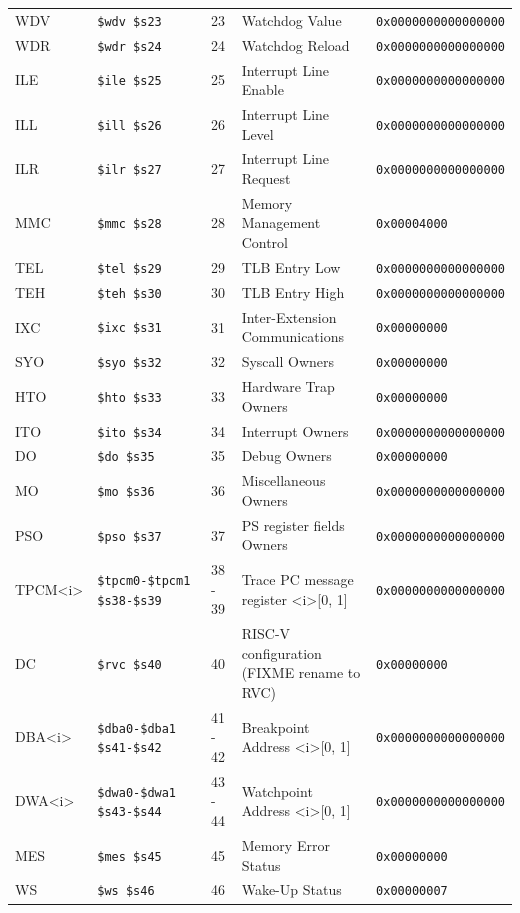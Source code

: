 {\begin{tabular}{|l|l|l|l|l|}
WDV & \verb|$wdv $s23| & 23 & Watchdog Value & \verb|0x0000000000000000| \\
WDR & \verb|$wdr $s24| & 24 & Watchdog Reload & \verb|0x0000000000000000| \\
ILE & \verb|$ile $s25| & 25 & Interrupt Line Enable & \verb|0x0000000000000000| \\
ILL & \verb|$ill $s26| & 26 & Interrupt Line Level & \verb|0x0000000000000000| \\
ILR & \verb|$ilr $s27| & 27 & Interrupt Line Request & \verb|0x0000000000000000| \\
MMC & \verb|$mmc $s28| & 28 & Memory Management Control & \verb|0x00004000| \\
TEL & \verb|$tel $s29| & 29 & TLB Entry Low & \verb|0x0000000000000000| \\
TEH & \verb|$teh $s30| & 30 & TLB Entry High & \verb|0x0000000000000000| \\
IXC & \verb|$ixc $s31| & 31 & Inter-Extension Communications & \verb|0x00000000| \\
SYO & \verb|$syo $s32| & 32 & Syscall Owners & \verb|0x00000000| \\
HTO & \verb|$hto $s33| & 33 & Hardware Trap Owners & \verb|0x00000000| \\
ITO & \verb|$ito $s34| & 34 & Interrupt Owners & \verb|0x0000000000000000| \\
DO & \verb|$do $s35| & 35 & Debug Owners & \verb|0x00000000| \\
MO & \verb|$mo $s36| & 36 & Miscellaneous Owners & \verb|0x0000000000000000| \\
PSO & \verb|$pso $s37| & 37 & PS register fields Owners & \verb|0x0000000000000000| \\
TPCM\textless i\textgreater & \verb|$tpcm0-$tpcm1 $s38-$s39| & 38 - 39 & Trace PC message register \textless i\textgreater [0, 1] & \verb|0x0000000000000000| \\
DC & \verb|$rvc $s40| & 40 & RISC-V configuration (FIXME rename to RVC) & \verb|0x00000000| \\
DBA\textless i\textgreater & \verb|$dba0-$dba1 $s41-$s42| & 41 - 42 & Breakpoint Address \textless i\textgreater [0, 1] & \verb|0x0000000000000000| \\
DWA\textless i\textgreater & \verb|$dwa0-$dwa1 $s43-$s44| & 43 - 44 & Watchpoint Address \textless i\textgreater [0, 1] & \verb|0x0000000000000000| \\
MES & \verb|$mes $s45| & 45 & Memory Error Status & \verb|0x00000000| \\
WS & \verb|$ws $s46| & 46 & Wake-Up Status & \verb|0x00000007| \\

\end{tabular}}
